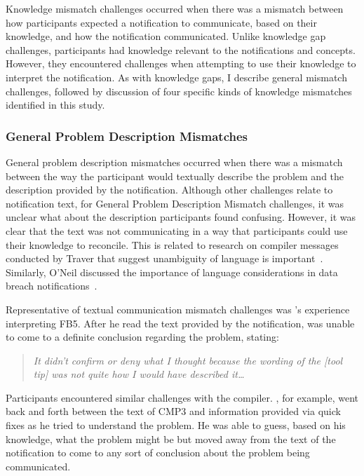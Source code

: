 Knowledge mismatch challenges occurred when there was a mismatch between how participants expected a notification to communicate, based on their knowledge, and how the notification communicated.
Unlike knowledge gap challenges, participants had knowledge relevant to the notifications and concepts. However, they encountered  challenges when attempting to use their knowledge to interpret the notification. 
As with knowledge gaps, I describe general mismatch challenges, followed by discussion of four specific kinds of knowledge mismatches identified in this study.  

\subsubsection{General Problem Description Mismatches}\label{sec:description}
General problem description mismatches occurred when there was a mismatch between the way the participant would textually describe the problem and the description provided by the notification.
Although other challenges relate to notification text, for General Problem Description Mismatch challenges, it was unclear what about the description participants found confusing.  
However, it was clear that the text was not communicating in a way that participants could use their knowledge to reconcile.
This is related to research on compiler messages conducted by Traver that suggest unambiguity of language is important~\cite{Traver:2010:Messages}.
Similarly, O'Neil discussed the importance of language considerations in data breach notifications~\cite{o2015target}.

Representative of textual communication mismatch challenges was 's experience interpreting FB5. After he read the text provided by the notification,  was unable to come to a definite conclusion regarding the problem, stating:

\begin{quote}
	\textit{It didn't confirm or deny what I thought because the wording of the [tool tip] was not quite how I would have described it\ldots}
\end{quote}

\noindent
Participants encountered similar challenges with the compiler. , for example, went back and forth between the text of CMP3 and information provided via quick fixes as he tried to understand the problem. 
He was able to guess, based on his knowledge, what the problem might be but moved away from the text of the notification to come to any sort of conclusion about the problem being communicated.

